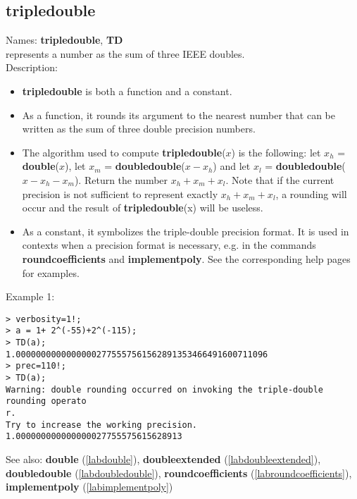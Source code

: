 \subsection{tripledouble}
\label{labtripledouble}
\noindent Names: \textbf{tripledouble}, \textbf{TD}\\
represents a number as the sum of three IEEE doubles.\\
\noindent Description: \begin{itemize}

\item \textbf{tripledouble} is both a function and a constant.

\item As a function, it rounds its argument to the nearest number that can be written
   as the sum of three double precision numbers.

\item The algorithm used to compute \textbf{tripledouble}($x$) is the following: let $x_h$ = \textbf{double}($x$),
   let $x_m$ = \textbf{doubledouble}($x-x_h$) and let $x_l$ = \textbf{doubledouble}($x-x_h-x_m$). 
   Return the number $x_h+x_m+x_l$. Note that if the
   current precision is not sufficient to represent exactly $x_h+x_m+x_l$, a rounding will
   occur and the result of \textbf{tripledouble}(x) will be useless.

\item As a constant, it symbolizes the triple-double precision format. It is used in 
   contexts when a precision format is necessary, e.g. in the commands 
   \textbf{roundcoefficients} and \textbf{implementpoly}.
   See the corresponding help pages for examples.
\end{itemize}
\noindent Example 1: 
\begin{center}\begin{minipage}{15cm}\begin{Verbatim}[frame=single]
> verbosity=1!;
> a = 1+ 2^(-55)+2^(-115);
> TD(a);
1.00000000000000002775557561562891353466491600711096
> prec=110!;
> TD(a);
Warning: double rounding occurred on invoking the triple-double rounding operato
r.
Try to increase the working precision.
1.000000000000000027755575615628913
\end{Verbatim}
\end{minipage}\end{center}
See also: \textbf{double} (\ref{labdouble}), \textbf{doubleextended} (\ref{labdoubleextended}), \textbf{doubledouble} (\ref{labdoubledouble}), \textbf{roundcoefficients} (\ref{labroundcoefficients}), \textbf{implementpoly} (\ref{labimplementpoly})
